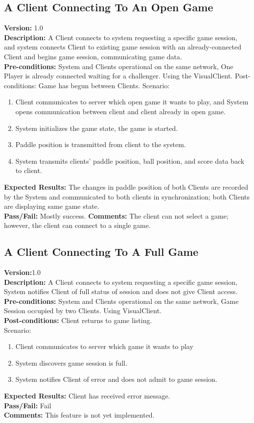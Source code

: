\documentclass[12pt]{article}
\begin{document}
\subsection{A Client Connecting To An Open Game}
\label{sec:openGameConnect}
\textbf{Version:} 1.0\\
\textbf{Description:} A Client connects to system requesting a specific game session, and system connects Client to existing game session with an already-connected Client and begins game session, communicating game data.\\
\textbf{Pre-conditions:} System and Clients operational on the same network, One Player is already connected waiting for a challenger.  Using the VisualClient.
Post-conditions: Game has begun between Clients.
Scenario:
\begin{enumerate}
\item Client communicates to server which open game it wants to play, and System opens communication between client and client already in open game.
\item System initializes the game state, the game is started.
\item Paddle position is transmitted from client to the system.
\item System transmits clients’ paddle position, ball position, and score data back to client.
\end{enumerate}
\textbf{Expected Results:} The changes in paddle position of both Clients are recorded by the System and communicated to both clients in synchronization; both Clients are displaying same game state.\\
\textbf{Pass/Fail:} Mostly success.
\textbf{Comments:} The client can not select a game; however, the client can connect to a single game.

\subsection{A Client Connecting To A Full Game}
\label{sec:fullGameConnect}
\textbf{Version:}1.0\\
\textbf{Description:} A Client connects to system requesting a specific game session, System notifies Client of full status of session and does not give Client access.\\
\textbf{Pre-conditions:} System and Clients operational on the same network, Game Session occupied by two Clients. Using VisualClient.\\
\textbf{Post-conditions:} Client returns to game listing.\\
Scenario:
\begin{enumerate}
\item Client communicates to server which game it wants to play
\item System discovers game session is full.
\item System notifies Client of error and does not admit to game session.
\end{enumerate}
\textbf{Expected Results:} Client has received error message.\\
\textbf{Pass/Fail:} Fail\\
\textbf{Comments:} This feature is not yet implemented.
\end{document}

